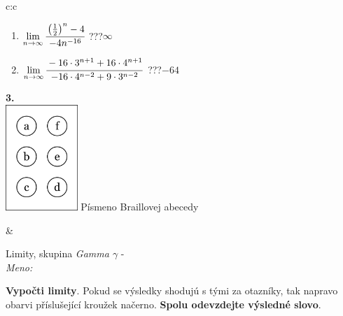 \documentclass[10pt]{report}
\begin{document}
\begin{tabular}{c:c}
\begin{minipage}[c][104.5mm][t]{0.5\linewidth}
\begin{center}
\begin{minipage}{0.79\linewidth}
\begin{center}
\begin{varwidth}{\linewidth}
\begin{enumerate}
\item $\lim\limits_{n\to\infty}\cfrac{\left(\frac{1}{2}\right)^n -4}{-4n^{-16}}$\quad \dotfill\; ???\;\dotfill \quad $\infty$
\item $\lim\limits_{n\to\infty}\cfrac{-16\cdot 3^{n+1}+16\cdot 4^{n+1}}{-16\cdot 4^{n-2}+9\cdot 3^{n-2}}$\quad \dotfill\; ???\;\dotfill \quad $-64$
\end{enumerate}
\end{varwidth}
\end{center}
\end{minipage}
\begin{minipage}{0.20\linewidth}
\begin{center}
{\Huge\bfseries 3.} \\[2mm]
\includegraphics[height=40mm]{../images/braille.png}
{\small Písmeno Braillovej abecedy}
\end{center}
\end{minipage}
\end{center}
\end{minipage}
&
\begin{minipage}[c][104.5mm][t]{0.5\linewidth}
\begin{center}
\vspace{7mm}
{\huge Limity, skupina \textit{Gamma $\gamma$} -}\\[5mm]
\textit{Meno:}\phantom{xxxxxxxxxxxxxxxxxxxxxxxxxxxxxxxxxxxxxxxxxxxxxxxxxxxxxxxxxxxxxxxxx}\\[5mm]
\begin{minipage}{0.95\linewidth}
\begin{center}
\textbf{Vypočti limity}. Pokud se výsledky shodujú s tými za otazníky, tak napravo\\obarvi příslušející kroužek načerno. \textbf{Spolu odevzdejte výsledné slovo}.
\end{center}
\end{minipage}
\\[1mm]
\begin{minipage}{0.79\linewidth}
\begin{center}
\begin{varwidth}{\linewidth}

\end{varwidth}
\end{center}
\end{minipage}
\end{center}
\end{minipage}
\end{tabular}
\end{document}
